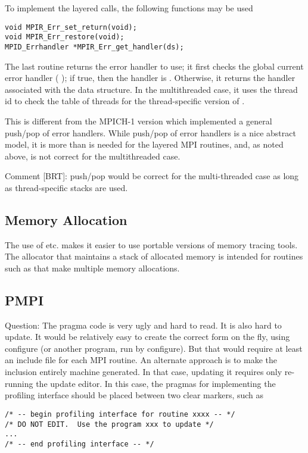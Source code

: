 \documentclass{article}
\begin{document}
To implement the layered calls, the following functions may be 
used 
\begin{verbatim}
void MPIR_Err_set_return(void);
void MPIR_Err_restore(void);
MPID_Errhandler *MPIR_Err_get_handler(ds);
\end{verbatim}
The last routine returns the error handler to use; it first checks the
global current error handler (
); if true, then the handler is
.  Otherwise, it returns the handler
associated with the data structure.  In the multithreaded case, it
uses the thread id to check the table of threads for the
thread-specific version of .

This is different from the MPICH-1 version which implemented a general
push/pop of error handlers.  While push/pop of error handlers is a
nice abstract model, it is more than is needed for the layered MPI
routines, and, as noted above, is not correct for the multithreaded
case.

Comment [BRT]: push/pop would be correct for the multi-threaded case
as long as thread-specific stacks are used.

\subsection{Memory Allocation}
The use of  etc. makes it easier to use portable versions of
memory tracing tools.  The allocator that maintains a stack of allocated
memory is intended for routines such as  that make
multiple memory allocations.

\subsection{PMPI}
Question: The pragma code is very ugly and hard to read.  It is also hard to
update.
It would be relatively
easy to create the correct form on the fly, using configure (or
another program, run by configure).  But that
would require at least an include file for each MPI routine.
An alternate approach is to make the inclusion entirely machine
generated.  In that case, updating it requires only re-running the
update editor.  In this case, the pragmas for implementing the
profiling interface should be placed between two clear markers, such
as 
\begin{verbatim}
/* -- begin profiling interface for routine xxxx -- */
/* DO NOT EDIT.  Use the program xxx to update */
...
/* -- end profiling interface -- */
\end{verbatim}
\end{document}
